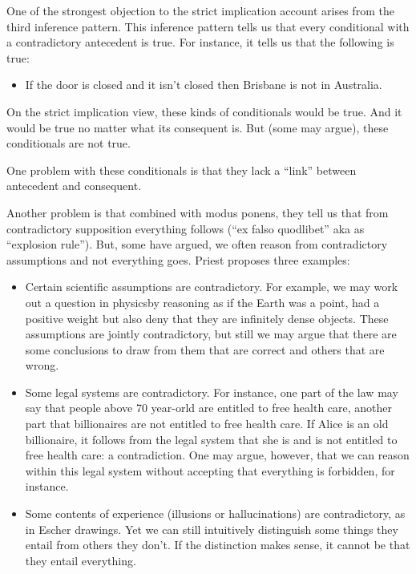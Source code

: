 \documentclass[../../../include/open-logic-section]{subfiles}
\begin{document}
One of the strongest objection to the strict implication account arises from the third inference pattern. This inference pattern tells us that every conditional with a contradictory antecedent is true. For instance, it tells us that the following is true:

\begin{itemize}
	\item If the door is closed and it isn't closed then Brisbane is not in Australia.
\end{itemize}

On the strict implication view, these kinds of conditionals would be true. And it would be true no matter what its consequent is. But (some may argue), these conditionals are not true.

One problem with these conditionals is that they lack a ``link'' between antecedent and consequent. 

Another problem is that combined with modus ponens, they tell us that from contradictory supposition everything follows (``ex falso quodlibet'' aka as ``explosion rule''). But, some have argued, we often reason from contradictory assumptions and not everything goes. Priest proposes three examples:

\begin{itemize}
	\item Certain scientific assumptions are contradictory. For example, we may work out a question in physicsby reasoning as if the Earth was a point, had a positive weight but also deny that they are infinitely dense objects. These assumptions are jointly contradictory, but still we may argue that there are some conclusions to draw from them that are correct and others that are wrong. 
	\item Some legal systems are contradictory. For instance, one part of the law may say that people above 70 year-orld are entitled to free health care, another part that billionaires are not entitled to free health care. If Alice is an old billionaire, it follows from the legal system that she is and is not entitled to free health care: a contradiction. One may argue, however, that we can reason within this legal system without accepting that everything is forbidden, for instance.
	\item Some contents of experience (illusions or hallucinations) are contradictory, as in Escher drawings. Yet we can still intuitively distinguish some things they entail from others they don't. If the distinction makes sense, it cannot be that they entail everything. 
\end{itemize}
\end{document}
